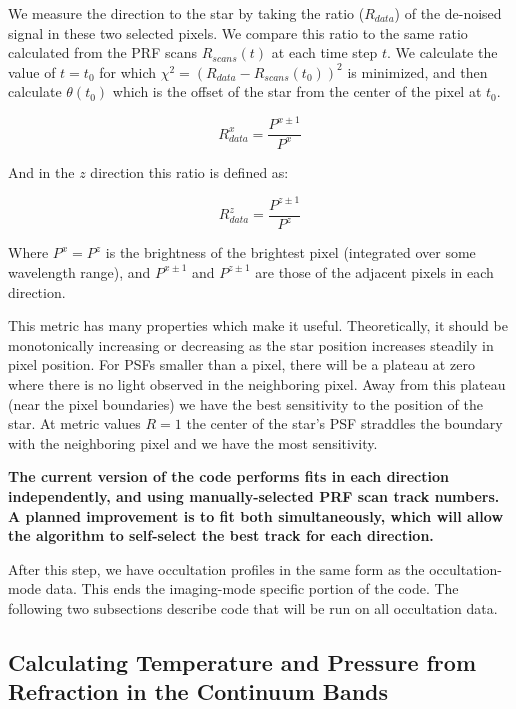 \documentclass[12pt]{article}
\begin{document}
We measure the direction to the star by taking the ratio ($R_{data}$) of the
de-noised signal in these two selected pixels.  We compare this ratio to the
same ratio calculated from the PRF scans $R_{scans}(t)$ at each time step $t$.
We calculate the value of $t=t_0$ for which $\chi^2 =
(R_{data}-R_{scans}(t_0))^2$ is minimized, and then calculate $\theta(t_0)$
which is the offset of the star from the center of the pixel at $t_0$. 

\begin{equation}
R_{data}^x = \frac{P^{x\pm1}}{P^{x}}
\end{equation}

And in the $z$ direction this ratio is defined as:

\begin{equation}
R_{data}^z = \frac{P^{z\pm1}}{P^{z}}
\end{equation}

Where $P^x = P^z$ is the brightness of the brightest pixel (integrated over
some wavelength range), and $P^{x\pm1}$ and $P^{z\pm1}$ are those of the
adjacent pixels in each direction.

This metric has many properties which make it useful. Theoretically, it should
be monotonically increasing or decreasing as the star position increases
steadily in pixel position.  For PSFs smaller than a pixel, there will be a
plateau at zero where there is no light observed in the neighboring pixel. Away
from this plateau (near the pixel boundaries) we have the best sensitivity to
the position of the star. At metric values $R = 1$ the center of the star's PSF
straddles the boundary with the neighboring pixel and we have the most
sensitivity.

{\bf The current version of the code performs fits in each direction independently,
and using manually-selected PRF scan track numbers. A planned improvement is to
fit both simultaneously, which will allow the algorithm to self-select the best
track for each direction.} 

After this step, we have occultation profiles in the same form as the
occultation-mode data. This ends the imaging-mode specific portion of the code.
The following two subsections describe code that will be run on all occultation
data.

\subsection{Calculating Temperature and Pressure from Refraction in the Continuum Bands}
\end{document}
